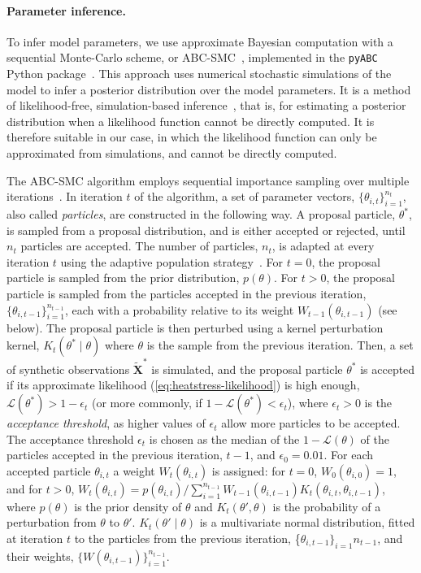 \documentclass[12pt]{extarticle}
\let\vec\mathbf
\newcommand{\likelihood}{\mathcal{L}}
\begin{document}
\paragraph{Parameter inference.} To infer model parameters, we use approximate Bayesian computation with a sequential Monte-Carlo scheme, or ABC-SMC~\citep{Sisson2009}, implemented in the \texttt{pyABC} Python package~\citep[\href{https://pyabc.readthedocs.io}{pyabc.readthedocs.io}]{Klinger2018}.
This approach uses numerical stochastic simulations of the model to infer a posterior distribution over the model parameters. It is a method of likelihood-free, simulation-based inference~\citep{Cranmer2020}, that is, for estimating a posterior distribution when a likelihood function cannot be directly computed. It is therefore suitable in our case, in which the likelihood function can only be approximated from simulations, and cannot be directly computed. 

The ABC-SMC algorithm employs sequential importance sampling over multiple iterations~\citep{Toni2009, Klinger2017, Syga2021}.
In iteration $t$ of the algorithm, a set of parameter vectors, $\{\theta_{i,t}\}_{i=1}^{n_t}$, also called \emph{particles}, are constructed in the following way.
A proposal particle, $\theta^*$, is sampled from a proposal distribution, and is either accepted or rejected, until $n_t$ particles are accepted.
The number of particles, $n_t$, is adapted at every iteration $t$ using the adaptive population strategy~\citep[\href{https://pyabc.readthedocs.io}{pyabc.readthedocs.io}]{Klinger2018}.
For $t=0$, the proposal particle is sampled from the prior distribution, $p(\theta)$.
For $t>0$, the proposal particle is sampled from the particles accepted in the previous iteration, $\{\theta_{i,t-1}\}_{i=1}^{n_{t-1}}$, each with a probability relative to its weight $W_{t-1}(\theta_{i,t-1})$ (see below). The proposal particle is then perturbed using a kernel perturbation kernel, $K_t(\theta^* \mid \theta)$ where $\theta$ is the sample from the previous iteration.
Then, a set of synthetic observations $\tilde{\vec X}^*$ is simulated, and the proposal particle $\theta^*$ is accepted if its approximate likelihood (\cref{eq:heatstress-likelihood}) is high enough, $\likelihood(\theta^*)>1-\epsilon_t$ (or more commonly, if $1-\likelihood(\theta^*) < \epsilon_t$), where $\epsilon_t>0$ is the \emph{acceptance threshold}, as higher values of $\epsilon_t$ allow more particles to be accepted. 
The acceptance threshold $\epsilon_t$ is chosen as the median of the $1-\likelihood(\theta)$ of the particles accepted in the previous iteration, $t-1$, and $\epsilon_0=0.01$. 
For each accepted particle $\theta_{i,t}$ a weight $W_t(\theta_{i,t})$ is assigned: for $t=0$, $W_0(\theta_{i,0})=1$, and for $t>0$, 
$W_t(\theta_{i,t}) = p(\theta_{i,t}) / \sum_{i=1}^{n_{t-1}}{W_{t-1}(\theta_{i,t-1}) K_t(\theta_{i,t}, \theta_{i,t-1})}$, where $p(\theta)$ is the prior density of $\theta$ and $K_t(\theta', \theta)$ is the probability of a perturbation from $\theta$ to $\theta'$.
$K_t(\theta' \mid \theta)$ is a multivariate normal distribution, fitted at iteration $t$ to the particles from the previous iteration, \{$\theta_{i,t-1}\}_{i=1}{n_{t-1}}$, and their weights, $\{W(\theta_{i,t-1})\}_{i=1}^{n_{t-1}}$.
\end{document}
